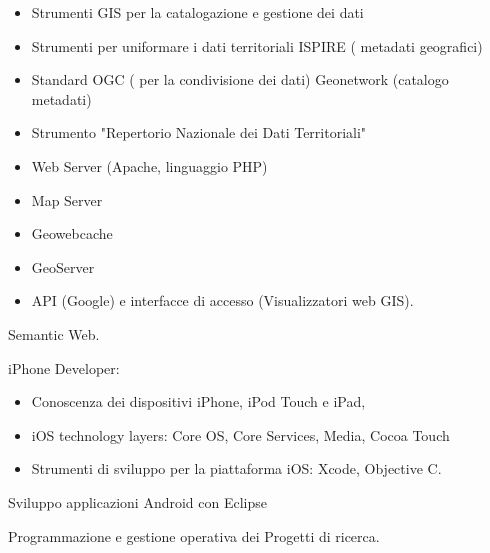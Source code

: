 \documentclass[totpages,helvetica,openbib,italian]{europecv}
\begin{document}
\begin{europecv}
{\begin{minipage}[t]{1\linewidth}
\begin{itemize}
  \vspace{-3mm}\item[]  Strumenti GIS per la catalogazione e gestione dei dati
\vspace{-3mm}\item[]    Strumenti per uniformare i dati territoriali
    ISPIRE ( metadati geografici)
\vspace{-3mm}\item[]    Standard OGC ( per la condivisione dei dati)
    Geonetwork (catalogo metadati)
\vspace{-3mm}\item[]    Strumento "Repertorio Nazionale dei Dati Territoriali"
\vspace{-3mm}\item[]    Web Server (Apache, linguaggio PHP)
\vspace{-3mm}\item[]    Map Server
\vspace{-3mm}\item[]    Geowebcache
\vspace{-3mm}\item[]    GeoServer
\vspace{-3mm}\item[]    API (Google) e interfacce di accesso (Visualizzatori web GIS).
    \end{itemize}

Semantic Web.
\vspace{1mm}
\vspace{1mm}

iPhone Developer:
\begin{itemize}

\vspace{-3mm}\item[]    Conoscenza dei dispositivi iPhone, iPod Touch e iPad,
\vspace{-3mm}\item[]    iOS technology layers: Core OS, Core Services, Media, Cocoa Touch
 \vspace{-3mm}\item[]   Strumenti di sviluppo per la piattaforma iOS: Xcode, Objective C.
    \end{itemize}
Sviluppo applicazioni Android con Eclipse\\
\vspace{1mm}

Programmazione e gestione operativa dei Progetti di ricerca.\\
\end{minipage}
}



\end{europecv}
\end{document}
